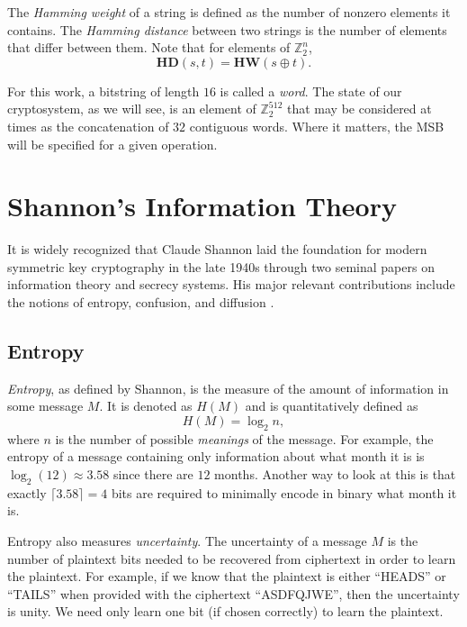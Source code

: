 The \emph{Hamming weight} of a string is defined as the number of nonzero elements it contains.
The \emph{Hamming distance} between two strings is the number of elements that differ between them.
Note that for elements of $\mathbb{Z}_2^n$, 
\begin{equation*}
\mathbf{HD}(s,t) = \mathbf{HW}(s \oplus t).
\end{equation*}

For this work, a bitstring of length $16$ is called a \emph{word}.
The state of our cryptosystem, as we will see, is an element of $\mathbb{Z}_2^{512}$ that may be considered at times as the concatenation of $32$ contiguous words.
Where it matters, the MSB will be specified for a given operation.

\section{Shannon's Information Theory}
It is widely recognized that Claude Shannon laid the foundation for modern symmetric key cryptography in the late 1940s through two seminal papers on information theory and secrecy systems.
His major relevant contributions include the notions of entropy, confusion, and diffusion \cite{Shannon1948_AMTOC}\cite{Shannon1949_CTOSS}.

\subsection{Entropy}
\emph{Entropy}, as defined by Shannon, is the measure of the amount of information in some message $M$. It is denoted as $H(M)$ and is quantitatively defined as  
\begin{equation*}
H(M) = \log_2 n,
\end{equation*}
where $n$ is the number of possible \emph{meanings} of the message.
For example, the entropy of a message containing only information about what month it is is $\log_2(12) \approx 3.58$ since there are $12$ months.
Another way to look at this is that exactly $\lceil 3.58 \rceil = 4$ bits are required to minimally encode in binary what month it is.

Entropy also measures \emph{uncertainty}.
The uncertainty of a message $M$ is the number of plaintext bits needed to be recovered from ciphertext in order to learn the plaintext.
For example, if we know that the plaintext is either ``HEADS'' or ``TAILS'' when provided with the ciphertext ``ASDFQJWE'', then the uncertainty is unity.
We need only learn one bit (if chosen correctly) to learn the plaintext.

